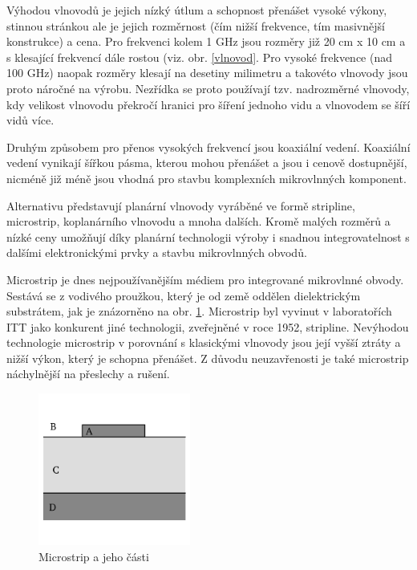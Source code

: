\documentclass[12pt,a4paper,oneside]{article}
\numberwithin{equation}{section} %
\numberwithin{figure}{section} %
\numberwithin{table}{section} %
\begin{document}
Výhodou vlnovodů je jejich nízký útlum a schopnost přenášet vysoké výkony, stinnou stránkou ale je jejich rozměrnost (čím nižší frekvence, tím masivnější konstrukce) a cena. Pro frekvenci kolem 1 GHz jsou rozměry již 20 cm x 10 cm a s klesající frekvencí dále rostou (viz. obr. \ref{vlnovod}. Pro vysoké frekvence (nad 100 GHz) naopak rozměry klesají na desetiny milimetru a takovéto vlnovody jsou proto náročné na výrobu. Nezřídka se proto používají tzv. nadrozměrné vlnovody, kdy velikost vlnovodu překročí hranici pro šíření jednoho vidu a vlnovodem se šíří vidů více. 

Druhým způsobem pro přenos vysokých frekvencí jsou koaxiální vedení. Koaxiální vedení vynikají šířkou pásma, kterou mohou přenášet a jsou i cenově dostupnější, nicméně již méně jsou vhodná pro stavbu komplexních mikrovlnných komponent.

Alternativu představují planární vlnovody vyráběné ve formě stripline, microstrip, koplanárního vlnovodu a mnoha dalších. Kromě malých rozměrů a nízké ceny umožňují díky planární technologii výroby i snadnou integrovatelnost s dalšími elektronickými prvky a stavbu mikrovlnných obvodů.

Microstrip je dnes nejpoužívanějším médiem pro integrované mikrovlnné obvody. Sestává se z vodivého proužkou, který je od země oddělen dielektrickým substrátem, jak je znázorněno na obr. \ref{microstrip}. Microstrip byl vyvinut v laboratořích ITT jako konkurent jiné technologii, zveřejněné v roce 1952, stripline. Nevýhodou technologie microstrip v porovnání s klasickými vlnovody jsou její vyšší ztráty a nižší výkon, který je schopna přenášet. Z důvodu neuzavřenosti je také microstrip náchylnější na přeslechy a rušení.

\begin{figure}[h] 
\begin{center}
\includegraphics[width=5cm]{microstrip.png}
\caption{Microstrip a jeho části}
\label{microstrip}
\end{center}
\end{figure}
\end{document}
